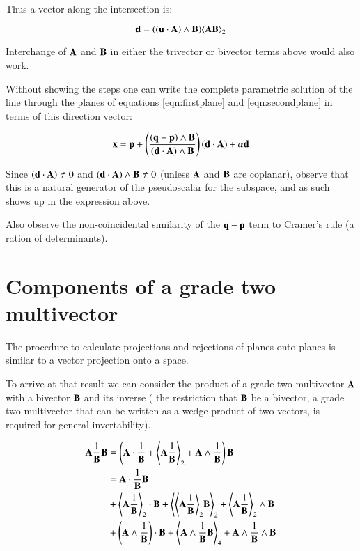 \documentclass{article}      %
\newcommand{\gpgrade}[2] {{\left\langle{{#1}}\right\rangle}_{#2}}
\newcommand{\gpgradetwo}[1] {\gpgrade{#1}{2}}
\newcommand{\gpgradefour}[1] {\gpgrade{#1}{4}}
\begin{document}
Thus a vector along the intersection is:

\begin{equation}\label{eqn:pseudoscalarinter}
\Bd = ((\Bu \cdot \BA) \wedge \BB) \gpgradetwo{\BA\BB}
\end{equation}

Interchange of $\mathbf{A}$ and $\mathbf{B}$ in either the trivector or bivector terms above would also work.

Without showing the steps one can write the complete parametric solution of the line through the planes of equations \ref{eqn:firstplane} and \ref{eqn:secondplane} in terms of this direction vector:

\begin{equation}\label{eqn:finalsolnofRNplaneintersection}
\mathbf{x} = \mathbf{p} + \left(\frac{(\mathbf{q} - \mathbf{p})\wedge \mathbf{B}}{(\mathbf{d} \cdot \mathbf{A}) \wedge \mathbf{B}}\right) (\mathbf{d} \cdot \mathbf{A}) + \alpha \mathbf{d}
\end{equation}

Since $(\mathbf{d} \cdot \mathbf{A}) \ne 0$ and $(\mathbf{d} \cdot \mathbf{A}) \wedge \mathbf{B} \ne 0$ (unless $\mathbf{A}$ and $\mathbf{B}$ are coplanar), observe that this is a natural generator
of the pseudoscalar for the subspace, and as such shows up in the expression
above.

Also observe the non-coincidental similarity of the $\mathbf{q}-\mathbf{p}$ term to Cramer's rule (a ration of determinants).

\section{ Components of a grade two multivector }

The procedure to calculate projections and rejections of planes onto planes
is similar to a vector projection onto a space.

To arrive at that result we can consider the product of a grade two multivector $\mathbf{A}$ with a bivector $\mathbf{B}$ and its inverse (
the restriction that $\mathbf{B}$ be a bivector, a grade two multivector that can be written as a wedge product of two vectors, is required for general invertability).

\begin{align*}
\BA\inv{\BB}\BB 
&= \left(\BA \cdot \inv{\BB} + \gpgradetwo{ \BA \inv{\BB} } + \BA \wedge \inv{\BB}\right) \BB \\
&= 
\BA \cdot \inv{\BB} \BB \\
&
+\gpgradetwo{ \BA \inv{\BB} } \cdot \BB 
+\gpgradetwo{ \gpgradetwo{ \BA \inv{\BB} } \BB }
+\gpgradetwo{ \BA \inv{\BB} } \wedge \BB \\
&
+\left(\BA \wedge \inv{\BB}\right) \cdot \BB 
+\gpgradefour{\BA \wedge \inv{\BB} \BB}
+\BA \wedge \inv{\BB} \wedge \BB \\
\end{align*}
\end{document}

